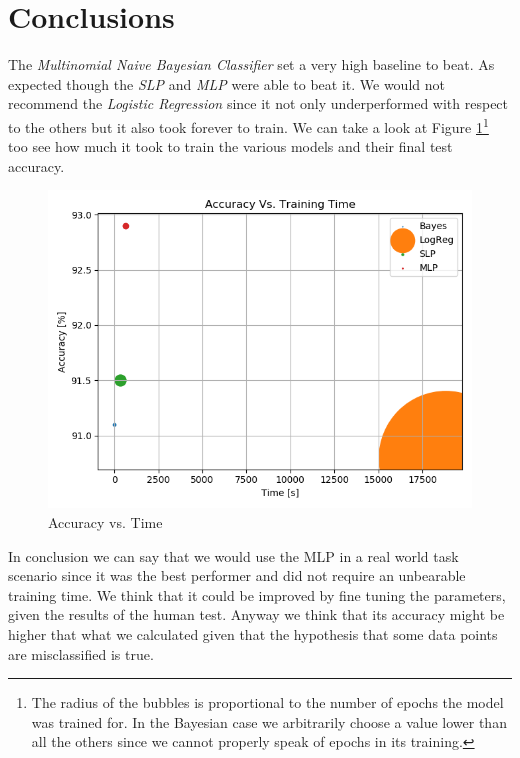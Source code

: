 \documentclass[10pt,a4paper]{report}
\begin{document}
\section{Conclusions}
The \textit{Multinomial Naive Bayesian Classifier} set a very high baseline to beat. As expected though the \textit{SLP} and \textit{MLP} were able to beat it. We would not recommend the \textit{Logistic Regression} since it not only underperformed with respect to the others but it also took forever to train. We can take a look at Figure \ref{fig:acc_time}\footnote{The radius of the bubbles is proportional to the number of epochs the model was trained for. In the Bayesian case we arbitrarily choose a value lower than all the others since we cannot properly speak of epochs in its training.} too see how much it took to train the various models and their final test accuracy.
\begin{figure}[!ht]
\centering
\includegraphics[width=0.5\linewidth]{acc_vs_time.png}
\caption{Accuracy vs. Time}
\label{fig:acc_time}
\end{figure}
In conclusion we can say that we would use the MLP in a real world task scenario since it was the best performer and did not require an unbearable training time. We think that it could be improved by fine tuning the parameters, given the results of the human test. Anyway we think that its accuracy might be higher that what we calculated given that the hypothesis that some data points are misclassified is true.
\end{document}
